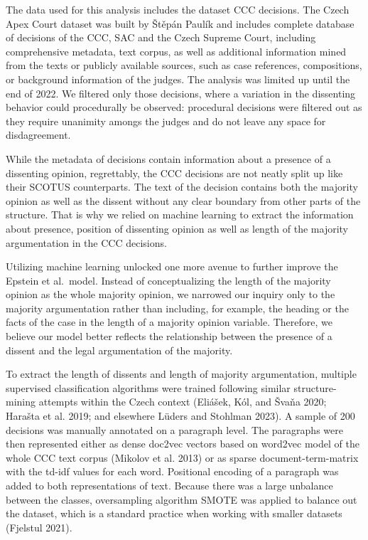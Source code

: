 \documentclass[
  11pt,
]{article}
\begin{document}
The data used for this analysis includes the dataset CCC decisions. The
Czech Apex Court dataset was built by Štěpán Paulík and includes
complete database of decisions of the CCC, SAC and the Czech Supreme
Court, including comprehensive metadata, text corpus, as well as
additional information mined from the texts or publicly available
sources, such as case references, compositions, or background
information of the judges. The analysis was limited up until the end of
2022. We filtered only those decisions, where a variation in the
dissenting behavior could procedurally be observed: procedural decisions
were filtered out as they require unanimity amongs the judges and do not
leave any space for disdagreement.

While the metadata of decisions contain information about a presence of
a dissenting opinion, regrettably, the CCC decisions are not neatly
split up like their SCOTUS counterparts. The text of the decision
contains both the majority opinion as well as the dissent without any
clear boundary from other parts of the structure. That is why we relied
on machine learning to extract the information about presence, position
of dissenting opinion as well as length of the majority argumentation in
the CCC decisions.

Utilizing machine learning unlocked one more avenue to further improve
the Epstein et al.~model. Instead of conceptualizing the length of the
majority opinion as the whole majority opinion, we narrowed our inquiry
only to the majority argumentation rather than including, for example,
the heading or the facts of the case in the length of a majority opinion
variable. Therefore, we believe our model better reflects the
relationship between the presence of a dissent and the legal
argumentation of the majority.

To extract the length of dissents and length of majority argumentation,
multiple supervised classification algorithms were trained following
similar structure-mining attempts within the Czech context (Eliášek,
Kól, and Švaňa 2020; Harašta et al. 2019; and elsewhere Lüders and
Stohlman 2023). A sample of 200 decisions was manually annotated on a
paragraph level. The paragraphs were then represented either as dense
doc2vec vectors based on word2vec model of the whole CCC text corpus
(Mikolov et al. 2013) or as sparse document-term-matrix with the td-idf
values for each word. Positional encoding of a paragraph was added to
both representations of text. Because there was a large unbalance
between the classes, oversampling algorithm SMOTE was applied to balance
out the dataset, which is a standard practice when working with smaller
datasets (Fjelstul 2021).
\end{document}
